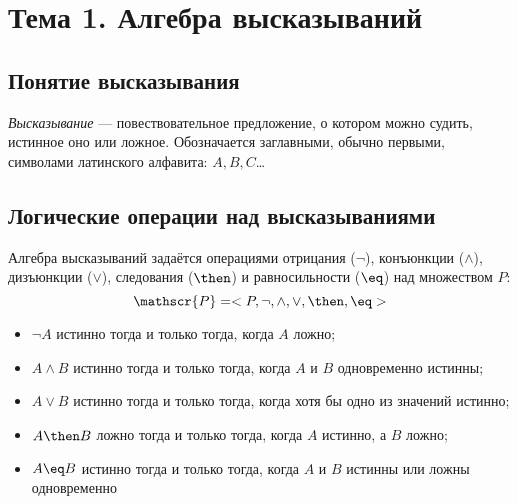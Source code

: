 \section{Тема 1. Алгебра высказываний}
\subsection{Понятие высказывания}
\dftion \textit{Высказывание} --- повествовательное предложение, о котором можно судить, истинное оно или ложное. Обозначается заглавными, обычно первыми, символами латинского алфавита: $A, B, C$\dots
\subsection{Логические операции над высказываниями}
Алгебра высказываний задаётся операциями отрицания ($\lnot$), конъюнкции ($\land$), дизъюнкции ($\lor$), следования ($\then$) и равносильности ($\eq$) над множеством $P$:
\begin{equation}
    \mathscr{P} = <P, \lnot, \land, \lor, \then, \eq>
\end{equation}

\begin{itemize}
    \item $\lnot A$ истинно тогда и только тогда, когда $A$ ложно;
    \item $A \land B$ истинно тогда и только тогда, когда $A$ и $B$ одновременно истинны;
    \item $A \lor B$ истинно тогда и только тогда, когда хотя бы одно из значений истинно;
    \item $A \then B$ ложно тогда и только тогда, когда $A$ истинно, а $B$ ложно;
    \item $A \eq B$ истинно тогда и только тогда, когда $A$ и $B$ истинны или ложны одновременно
\end{itemize}
